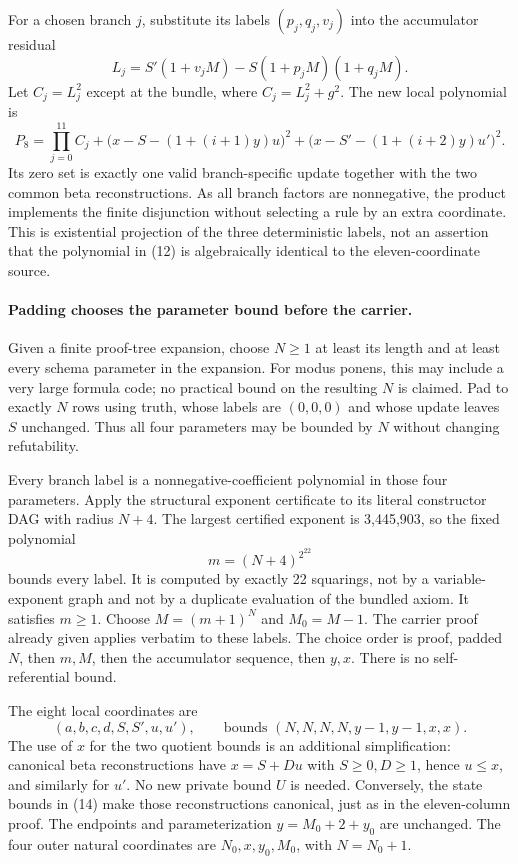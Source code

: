 \documentclass[11pt]{article}
\begin{document}
For a chosen branch $j$, substitute its labels $(p_j,q_j,v_j)$ into the
accumulator residual
\[
 L_j=S'(1+v_jM)-S(1+p_jM)(1+q_jM).
\]
Let $C_j=L_j^2$ except at the bundle, where
$C_j=L_j^2+g^2$.  The new local polynomial is
\[
 P_8=\prod_{j=0}^{11}C_j
 +\bigl(x-S-(1+(i+1)y)u\bigr)^2
 +\bigl(x-S'-(1+(i+2)y)u'\bigr)^2. \tag{12}
\]
Its zero set is exactly one valid branch-specific update together with
the two common beta reconstructions.  As all branch factors are
nonnegative, the product implements the finite disjunction without
selecting a rule by an extra coordinate.  This is existential projection
of the three deterministic labels, not an assertion that the polynomial
in (12) is algebraically identical to the eleven-coordinate source.

\paragraph{Padding chooses the parameter bound before the carrier.}
Given a finite proof-tree expansion, choose $N\ge1$ at least its length
and at least every schema parameter in the expansion.  For modus ponens,
this may include a very large formula code; no practical bound on the
resulting $N$ is claimed.  Pad to exactly $N$ rows using truth, whose
labels are $(0,0,0)$ and whose update leaves $S$ unchanged.  Thus all four
parameters may be bounded by $N$ without changing refutability.

Every branch label is a nonnegative-coefficient polynomial in those four
parameters.  Apply the structural exponent certificate to its literal
constructor DAG with radius $N+4$.  The largest certified exponent is
3,445,903, so the fixed polynomial
\[
 m=(N+4)^{2^{22}} \tag{13}
\]
bounds every label.  It is computed by exactly 22 squarings, not by a
variable-exponent graph and not by a duplicate evaluation of the bundled
axiom.  It satisfies $m\ge1$.  Choose $M=(m+1)^N$ and $M_0=M-1$.
The carrier proof already given applies verbatim to these labels.  The
choice order is proof, padded $N$, then $m,M$, then the accumulator
sequence, then $y,x$.  There is no self-referential bound.

The eight local coordinates are
\[
 (a,b,c,d,S,S',u,u'),\qquad
 \text{bounds }(N,N,N,N,y-1,y-1,x,x). \tag{14}
\]
The use of $x$ for the two quotient bounds is an additional simplification:
canonical beta reconstructions have
$x=S+Du$ with $S\ge0,D\ge1$, hence $u\le x$, and similarly for $u'$.
No new private bound $U$ is needed.  Conversely, the state bounds in (14)
make those reconstructions canonical, just as in the eleven-column proof.
The endpoints and parameterization $y=M_0+2+y_0$ are unchanged.
The four outer natural coordinates are $N_0,x,y_0,M_0$, with $N=N_0+1$.
\end{document}
